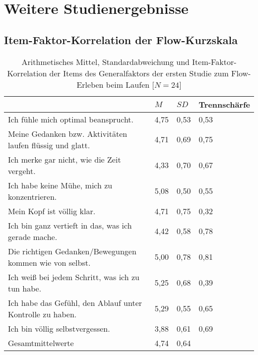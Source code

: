 

\chapter{Weitere Studienergebnisse} 

\label{cha:weitere_studienergebnisse}

\section{Item-Faktor-Korrelation der Flow-Kurzskala} 

\label{sec:item_faktor_korrelation_der_fks} 
\begin{table}
	[!htb] \centering \caption[Item-Faktor-Korrelation der Items des Generalfaktors (Erste Studie: Laufen)]{Arithmetisches Mittel, Standardabweichung und Item-Faktor-Korrelation der Items des Generalfaktors der ersten Studie zum Flow-Erleben beim Laufen [$N = 24$]} \label{tab:generalfaktor_1} 
	\begin{tabularx}
		{ 
		\textwidth}{p{} p{} p{} p{}} \toprule & $M$ & $SD$ & Trennschärfe \\
		\midrule Ich fühle mich optimal beansprucht. & 4,75 & 0,53 & 0,53 \\
		Meine Gedanken bzw. Aktivitäten laufen flüssig und glatt. & 4,71 & 0,69 & 0,75 \\
		Ich merke gar nicht, wie die Zeit vergeht. & 4,33 & 0,70 & 0,67 \\
		Ich habe keine Mühe, mich zu konzentrieren. & 5,08 & 0,50 & 0,55 \\
		Mein Kopf ist völlig klar. & 4,71 & 0,75 & 0,32 \\
		Ich bin ganz vertieft in das, was ich gerade mache. & 4,42 & 0,58 & 0,78 \\
		Die richtigen Gedanken/Bewegungen kommen wie von selbst. & 5,00 & 0,78 & 0,81 \\
		Ich weiß bei jedem Schritt, was ich zu tun habe. & 5,25 & 0,68 & 0,39 \\
		Ich habe das Gefühl, den Ablauf unter Kontrolle zu haben. & 5,29 & 0,55 & 0,65 \\
		Ich bin völlig selbstvergessen. & 3,88 & 0,61 & 0,69 \\
		Gesamtmittelwerte & 4,74 & 0,64 & \\
		\bottomrule 
	\end{tabularx}
\end{table}
